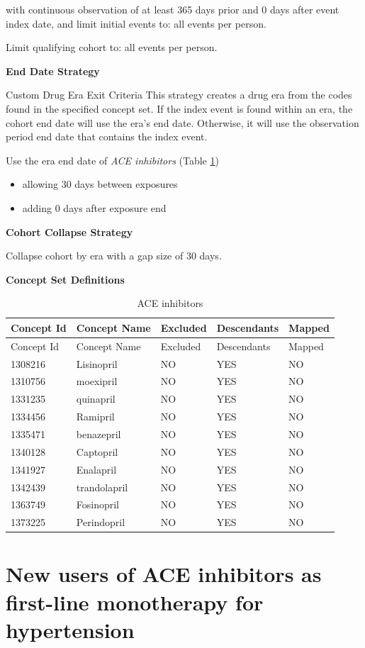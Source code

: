 \documentclass[11pt]{book}
\providecommand{\tightlist}{%
  \setlength{\itemsep}{0pt}\setlength{\parskip}{0pt}}
\begin{document}
with continuous observation of at least 365 days prior and 0 days after
event index date, and limit initial events to: all events per person.

Limit qualifying cohort to: all events per person.

\textbf{End Date Strategy}

Custom Drug Era Exit Criteria This strategy creates a drug era from the
codes found in the specified concept set. If the index event is found
within an era, the cohort end date will use the era's end date.
Otherwise, it will use the observation period end date that contains the
index event.

Use the era end date of \emph{ACE inhibitors} (Table
\ref{tab:aceInhibitors})

\begin{itemize}
\tightlist
\item
  allowing 30 days between exposures
\item
  adding 0 days after exposure end
\end{itemize}

\textbf{Cohort Collapse Strategy}

Collapse cohort by era with a gap size of 30 days.

\textbf{Concept Set Definitions}

\begin{longtable}[]{@{}lllll@{}}
\caption{\label{tab:aceInhibitors} ACE inhibitors}\tabularnewline
\toprule
Concept Id & Concept Name & Excluded & Descendants &
Mapped\tabularnewline
\midrule
\endfirsthead
\toprule
Concept Id & Concept Name & Excluded & Descendants &
Mapped\tabularnewline
\midrule
\endhead
1308216 & Lisinopril & NO & YES & NO\tabularnewline
1310756 & moexipril & NO & YES & NO\tabularnewline
1331235 & quinapril & NO & YES & NO\tabularnewline
1334456 & Ramipril & NO & YES & NO\tabularnewline
1335471 & benazepril & NO & YES & NO\tabularnewline
1340128 & Captopril & NO & YES & NO\tabularnewline
1341927 & Enalapril & NO & YES & NO\tabularnewline
1342439 & trandolapril & NO & YES & NO\tabularnewline
1363749 & Fosinopril & NO & YES & NO\tabularnewline
1373225 & Perindopril & NO & YES & NO\tabularnewline
\bottomrule
\end{longtable}

\section{New users of ACE inhibitors as first-line monotherapy for
hypertension}\label{AceInhibitorsMono}
\end{document}
